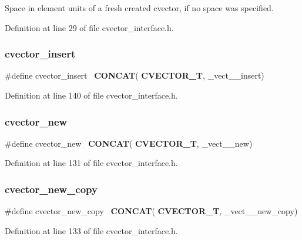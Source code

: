 Space in element units of a fresh created cvector, if no space was specified. 

Definition at line 29 of file cvector\+\_\+interface.\+h.

\mbox{\label{cvector__interface_8h_a43cb4f7b550a0b1a71e8b9d962806395}} 
\subsubsection{cvector\+\_\+insert}
{\footnotesize\ttfamily \#define cvector\+\_\+insert~\textbf{ C\+O\+N\+C\+AT}(\textbf{ C\+V\+E\+C\+T\+O\+R\+\_\+T}, \+\_\+vect\+\_\+\+\_\+insert)}



Definition at line 140 of file cvector\+\_\+interface.\+h.

\mbox{\label{cvector__interface_8h_af3643ddbd25169dad31b44b959394dc7}} 
\subsubsection{cvector\+\_\+new}
{\footnotesize\ttfamily \#define cvector\+\_\+new~\textbf{ C\+O\+N\+C\+AT}(\textbf{ C\+V\+E\+C\+T\+O\+R\+\_\+T}, \+\_\+vect\+\_\+\+\_\+new)}



Definition at line 131 of file cvector\+\_\+interface.\+h.

\mbox{\label{cvector__interface_8h_abcbb5e5e4cdf38758949ca5f10c30e47}} 
\subsubsection{cvector\+\_\+new\+\_\+copy}
{\footnotesize\ttfamily \#define cvector\+\_\+new\+\_\+copy~\textbf{ C\+O\+N\+C\+AT}(\textbf{ C\+V\+E\+C\+T\+O\+R\+\_\+T}, \+\_\+vect\+\_\+\+\_\+new\+\_\+copy)}



Definition at line 133 of file cvector\+\_\+interface.\+h.

